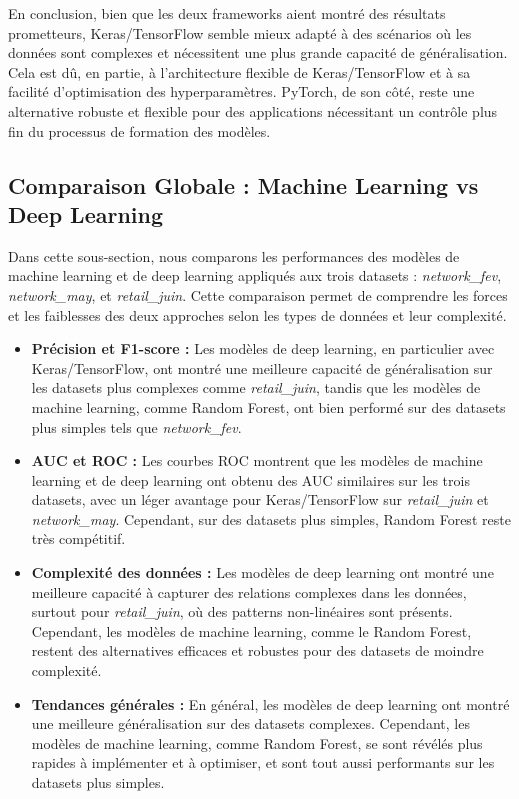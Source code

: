 En conclusion, bien que les deux frameworks aient montré des résultats prometteurs, Keras/TensorFlow semble mieux adapté à des scénarios où les données sont complexes et nécessitent une plus grande capacité de généralisation. Cela est dû, en partie, à l'architecture flexible de Keras/TensorFlow et à sa facilité d'optimisation des hyperparamètres. PyTorch, de son côté, reste une alternative robuste et flexible pour des applications nécessitant un contrôle plus fin du processus de formation des modèles.

\subsection{Comparaison Globale : Machine Learning vs Deep Learning}

Dans cette sous-section, nous comparons les performances des modèles de machine learning et de deep learning appliqués aux trois datasets : \textit{network\_fev}, \textit{network\_may}, et \textit{retail\_juin}. Cette comparaison permet de comprendre les forces et les faiblesses des deux approches selon les types de données et leur complexité.

\begin{itemize}
    \item \textbf{Précision et F1-score :} Les modèles de deep learning, en particulier avec Keras/TensorFlow, ont montré une meilleure capacité de généralisation sur les datasets plus complexes comme \textit{retail\_juin}, tandis que les modèles de machine learning, comme Random Forest, ont bien performé sur des datasets plus simples tels que \textit{network\_fev}.
    
    \item \textbf{AUC et ROC :} Les courbes ROC montrent que les modèles de machine learning et de deep learning ont obtenu des AUC similaires sur les trois datasets, avec un léger avantage pour Keras/TensorFlow sur \textit{retail\_juin} et \textit{network\_may}. Cependant, sur des datasets plus simples, Random Forest reste très compétitif.

    \item \textbf{Complexité des données :} Les modèles de deep learning ont montré une meilleure capacité à capturer des relations complexes dans les données, surtout pour \textit{retail\_juin}, où des patterns non-linéaires sont présents. Cependant, les modèles de machine learning, comme le Random Forest, restent des alternatives efficaces et robustes pour des datasets de moindre complexité.

    \item \textbf{Tendances générales :} En général, les modèles de deep learning ont montré une meilleure généralisation sur des datasets complexes. Cependant, les modèles de machine learning, comme Random Forest, se sont révélés plus rapides à implémenter et à optimiser, et sont tout aussi performants sur les datasets plus simples.
\end{itemize}

